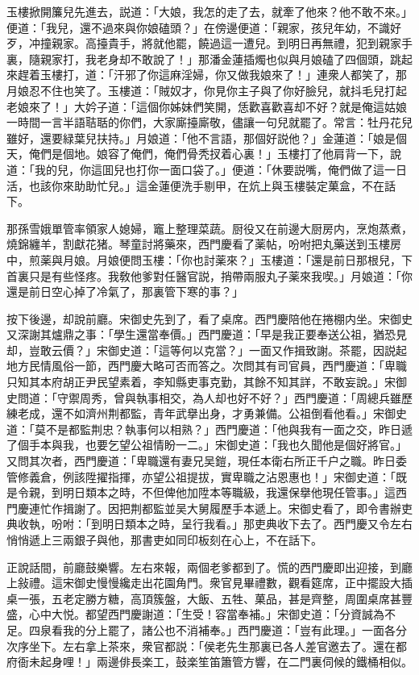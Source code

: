玉樓掀開簾兒先進去，説道：「大娘，我怎的走了去，就牽了他來？他不敢不來。」便道：「我兒，還不過來與你娘磕頭？」在傍邊便道：「親家，孩兒年幼，不識好歹，冲撞親家。高擡貴手，將就他罷，饒過這一遭兒。到明日再無禮，犯到親家手裏，隨親家打，我老身却不敢說了！」那潘金蓮插燭也似與月娘磕了四個頭，跳起來趕着玉樓打，道：「汗邪了你這麻淫婦，你又做我娘來了！」連衆人都笑了，那月娘忍不住也笑了。玉樓道：「賊奴才，你見你主子與了你好臉兒，就抖毛兒打起老娘來了！」大妗子道：「這個你姊妹們笑開，恁歡喜歡喜却不好？就是俺這姑娘一時間一言半語聐聒的你們，大家廝擡廝敬，儘讓一句兒就罷了。常言：牡丹花兒雖好，還要緑葉兒扶持。」月娘道：「他不言語，那個好説他？」金蓮道：「娘是個天，俺們是個地。娘容了俺們，俺們骨秃扠着心裏！」玉樓打了他肩背一下，說道：「我的兒，你這囬兒也打你一面口袋了。」便道：「休要説嘴，俺們做了這一日活，也該你來助助忙兒。」這金蓮便洗手剔甲，在炕上與玉樓裝定菓盒，不在話下。

那孫雪娥單管率領家人媳婦，竈上整理菜蔬。厨役又在前邊大厨房内，烹炮蒸煮，燒錦纏羊，割獻花猪。琴童討將藥來，西門慶看了薬帖，吩咐把丸藥送到玉樓房中，煎薬與月娘。月娘便問玉樓：「你也討薬來？」玉樓道：「還是前日那根兒，下首裏只是有些怪疼。我敎他爹對任醫官説，捎帶兩服丸子薬來我喫。」月娘道：「你還是前日空心掉了冷氣了，那裏管下寒的事？」

按下後邊，却說前廳。宋御史先到了，看了桌席。西門慶陪他在捲棚内坐。宋御史又深謝其爐鼎之事：「學生還當奉價。」西門慶道：「早是我正要奉送公祖，猶恐見却，豈敢云價？」宋御史道：「這等何以克當？」一面又作揖致謝。茶罷，因説起地方民情風俗一節，西門慶大略可否而答之。次問其有司官員，西門慶道：「卑職只知其本府胡正尹民望素着，李知縣吏事克勤，其餘不知其詳，不敢妄說。」宋御史問道：「守禦周秀，曾與執事相交，為人却也好不好？」西門慶道：「周總兵雖歷練老成，還不如濟州荆都監，青年武擧出身，才勇兼備。公祖倒看他看。」宋御史道：「莫不是都監荆忠？執事何以相熟？」西門慶道：「他與我有一面之交，昨日遞了個手本與我，也要乞望公祖情盼一二。」宋御史道：「我也久聞他是個好將官。」又問其次者，西門慶道：「卑職還有妻兄吴鎧，現任本衛右所正千户之職。昨日委管修義倉，例該陞擢指揮，亦望公祖提拔，實卑職之沾恩惠也！」宋御史道：「既是令親，到明日類本之時，不但俾他加陞本等職級，我還保擧他現任管事。」這西門慶連忙作揖謝了。因把荆都監並吴大舅履歷手本遞上。宋御史看了，即令書辦吏典收執，吩咐：「到明日類本之時，呈行我看。」那吏典收下去了。西門慶又令左右悄悄遞上三兩銀子與他，那書吏如同印板刻在心上，不在話下。

正說話間，前廳鼓樂響。左右來報，兩個老爹都到了。慌的西門慶即出迎接，到廳上敍禮。這宋御史慢慢纔走出花園角門。衆官見畢禮數，觀看筵席，正中擺設大插桌一張，五老定勝方糖，高頂簇盤，大飯、五牲、菓品，甚是齊整，周圍桌席甚豐盛，心中大悦。都望西門慶謝道：「生受！容當奉補。」宋御史道：「分資誠為不足。四泉看我的分上罷了，諸公也不消補奉。」西門慶道：「豈有此理。」一面各分次序坐下。左右拿上茶來，衆官都説：「侯老先生那裏已各人差官邀去了。還在都府衙未起身哩！」兩邊俳長楽工，鼓楽笙笛簫管方響，在二門裏伺候的鐵桶相似。

